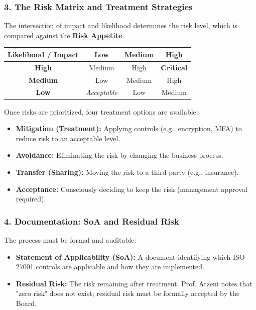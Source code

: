 \subsubsection*{3. The Risk Matrix and Treatment Strategies}
The intersection of impact and likelihood determines the risk level, which is compared against the \textbf{Risk Appetite}.
\begin{center}
\small
\begin{tabular}{|c|c|c|c|}
\hline
\textbf{Likelihood / Impact} & \textbf{Low} & \textbf{Medium} & \textbf{High} \\
\hline
\textbf{High} & Medium & High & \textbf{Critical} \\
\hline
\textbf{Medium} & Low & Medium & High \\
\hline
\textbf{Low} & \textit{Acceptable} & Low & Medium \\
\hline
\end{tabular}
\end{center}
Once risks are prioritized, four treatment options are available:
\begin{itemize}
    \item \textbf{Mitigation (Treatment):} Applying controls (e.g., encryption, MFA) to reduce risk to an acceptable level.
    \item \textbf{Avoidance:} Eliminating the risk by changing the business process.
    \item \textbf{Transfer (Sharing):} Moving the risk to a third party (e.g., insurance).
    \item \textbf{Acceptance:} Consciously deciding to keep the risk (management approval required).
\end{itemize}

\subsubsection*{4. Documentation: SoA and Residual Risk}
The process must be formal and auditable:
\begin{itemize}
    \item \textbf{Statement of Applicability (SoA):} A document identifying which ISO 27001 controls are applicable and how they are implemented.
    \item \textbf{Residual Risk:} The risk remaining after treatment. Prof. Atzeni notes that "zero risk" does not exist; residual risk must be formally accepted by the Board.
\end{itemize}



